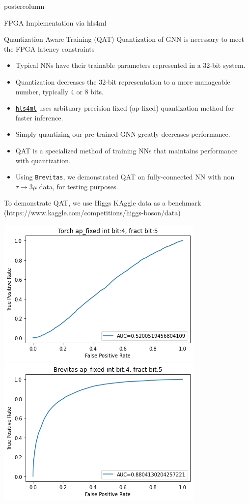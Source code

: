 \documentclass[final,hyperref={pdfpagelabels=false}]{beamer}
\newcommand{\hlsfml}{{\href{https://github.com/hls-fpga-machine-learning/hls4ml}{\texttt{hls4ml}}}}
\begin{document}
\begin{frame}
\begin{columns}
\begin{column}{.49\textwidth}
\begin{beamercolorbox}[center,wd=\textwidth]{postercolumn}
\begin{minipage}[T]{.95\textwidth}
{\begin{block}{FPGA Implementation via hls4ml}
            \end{block}
                  \begin{block}{Quantization Aware Training (QAT)}
                    Quantization of GNN is necessary to meet the FPGA latency constraints
                    \begin{itemize}
                    \item Typical NNs have their trainable parameters represented in a 32-bit system.
                    \item Quantization decreases the 32-bit representation to a more manageable number, typically 4 or 8 bits. 
                    \item \hlsfml \; uses arbituary precision fixed (ap-fixed) quantization method for faster inference.
                    \item Simply quantizing our pre-trained GNN greatly decreases performance.
                    \item QAT is a specialized method of training NNs that maintains performance with quantization.
                    \item Using {\tt Brevitas}, we demonstrated QAT on fully-connected NN with non $\tau \rightarrow 3 \mu$ data, for testing purposes.
                    \end{itemize}
                \vspace{0.5in}
                    To demonstrate QAT, we use Higgs KAggle data as a benchmark (https://www.kaggle.com/competitions/higgs-boson/data)
                   \begin{center}
                \includegraphics[width=0.49\linewidth]{figures/torch_quantized.png}
                \includegraphics[width=0.49\linewidth]{figures/bv_quantized.png}
              \end{center}
                  

\end{block}}
\end{minipage}
\end{beamercolorbox}
\end{column}
\end{columns}
\end{frame}
\end{document}

